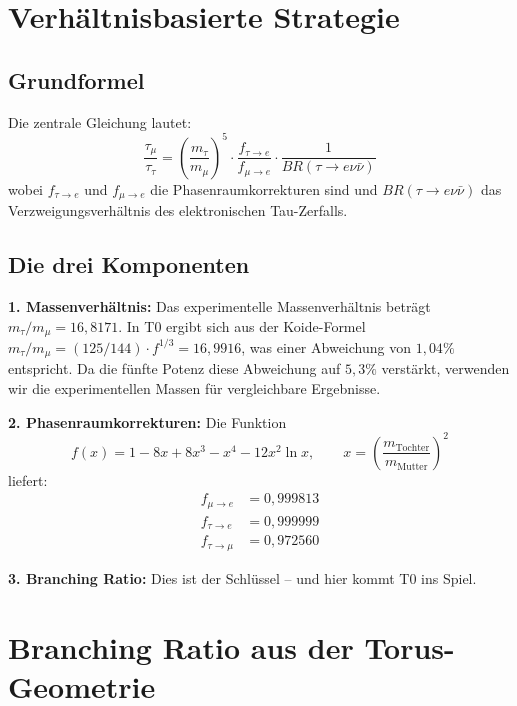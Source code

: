 	
	\section{Verhältnisbasierte Strategie}
	
	\subsection{Grundformel}
	
	Die zentrale Gleichung lautet:
	\begin{equation}
		\frac{\tau_\mu}{\tau_\tau} = \left(\frac{m_\tau}{m_\mu}\right)^5 \cdot \frac{f_{\tau \to e}}{f_{\mu \to e}} \cdot \frac{1}{BR(\tau \to e \nu \bar\nu)}
		\label{eq:lifetime-ratio}
	\end{equation}
	wobei $f_{\tau \to e}$ und $f_{\mu \to e}$ die Phasenraumkorrekturen sind und $BR(\tau \to e \nu \bar\nu)$ das Verzweigungsverhältnis des elektronischen Tau-Zerfalls.
	
	\subsection{Die drei Komponenten}
	
	\textbf{1. Massenverhältnis:} Das experimentelle Massenverhältnis beträgt $m_\tau/m_\mu = 16{,}8171$. In T0 ergibt sich aus der Koide-Formel $m_\tau/m_\mu = (125/144) \cdot f^{1/3} = 16{,}9916$, was einer Abweichung von $1{,}04\%$ entspricht. Da die fünfte Potenz diese Abweichung auf $5{,}3\%$ verstärkt, verwenden wir die experimentellen Massen für vergleichbare Ergebnisse.
	
	\textbf{2. Phasenraumkorrekturen:} Die Funktion
	\begin{equation}
		f(x) = 1 - 8x + 8x^3 - x^4 - 12 x^2 \ln x, \qquad x = \left(\frac{m_\text{Tochter}}{m_\text{Mutter}}\right)^2
	\end{equation}
	liefert:
	\begin{align}
		f_{\mu \to e} &= 0{,}999813 \\
		f_{\tau \to e} &= 0{,}999999 \\
		f_{\tau \to \mu} &= 0{,}972560
	\end{align}
	
	\textbf{3. Branching Ratio:} Dies ist der Schlüssel -- und hier kommt T0 ins Spiel.
	
	
	\section{Branching Ratio aus der Torus-Geometrie}
	
